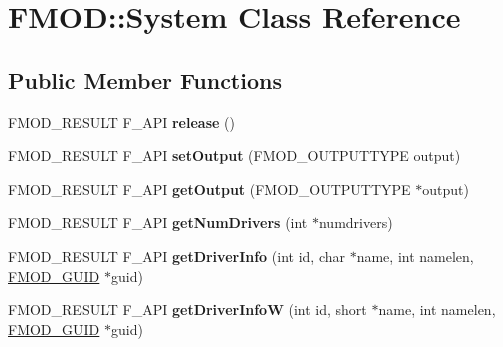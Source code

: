 \hypertarget{class_f_m_o_d_1_1_system}{}\section{F\+M\+OD\+:\+:System Class Reference}
\label{class_f_m_o_d_1_1_system}
\subsection*{Public Member Functions}
\begin{DoxyCompactItemize}
\item 
F\+M\+O\+D\+\_\+\+R\+E\+S\+U\+LT F\+\_\+\+A\+PI {\bfseries release} ()\hypertarget{class_f_m_o_d_1_1_system_aa7ac27bd5b475d40b6ca4b3b93a9351d}{}\label{class_f_m_o_d_1_1_system_aa7ac27bd5b475d40b6ca4b3b93a9351d}

\item 
F\+M\+O\+D\+\_\+\+R\+E\+S\+U\+LT F\+\_\+\+A\+PI {\bfseries set\+Output} (F\+M\+O\+D\+\_\+\+O\+U\+T\+P\+U\+T\+T\+Y\+PE output)\hypertarget{class_f_m_o_d_1_1_system_a97cba04b9a36251e4443aaeba23f2d45}{}\label{class_f_m_o_d_1_1_system_a97cba04b9a36251e4443aaeba23f2d45}

\item 
F\+M\+O\+D\+\_\+\+R\+E\+S\+U\+LT F\+\_\+\+A\+PI {\bfseries get\+Output} (F\+M\+O\+D\+\_\+\+O\+U\+T\+P\+U\+T\+T\+Y\+PE $\ast$output)\hypertarget{class_f_m_o_d_1_1_system_a3abd8e368b7b220b761fd885ba150485}{}\label{class_f_m_o_d_1_1_system_a3abd8e368b7b220b761fd885ba150485}

\item 
F\+M\+O\+D\+\_\+\+R\+E\+S\+U\+LT F\+\_\+\+A\+PI {\bfseries get\+Num\+Drivers} (int $\ast$numdrivers)\hypertarget{class_f_m_o_d_1_1_system_aabd75260613afffc7ef0650ac62ef2f4}{}\label{class_f_m_o_d_1_1_system_aabd75260613afffc7ef0650ac62ef2f4}

\item 
F\+M\+O\+D\+\_\+\+R\+E\+S\+U\+LT F\+\_\+\+A\+PI {\bfseries get\+Driver\+Info} (int id, char $\ast$name, int namelen, \hyperlink{struct_f_m_o_d___g_u_i_d}{F\+M\+O\+D\+\_\+\+G\+U\+ID} $\ast$guid)\hypertarget{class_f_m_o_d_1_1_system_a1740086b76cb4609109cb2b7c6484749}{}\label{class_f_m_o_d_1_1_system_a1740086b76cb4609109cb2b7c6484749}

\item 
F\+M\+O\+D\+\_\+\+R\+E\+S\+U\+LT F\+\_\+\+A\+PI {\bfseries get\+Driver\+InfoW} (int id, short $\ast$name, int namelen, \hyperlink{struct_f_m_o_d___g_u_i_d}{F\+M\+O\+D\+\_\+\+G\+U\+ID} $\ast$guid)\hypertarget{class_f_m_o_d_1_1_system_ad08a70658919844b618ff2ade2e2441a}{}\label{class_f_m_o_d_1_1_system_ad08a70658919844b618ff2ade2e2441a}


\end{DoxyCompactItemize}
